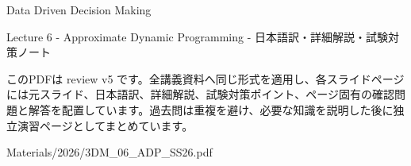 \documentclass[a4paper,landscape,9pt]{article}
\begin{document}
\begin{titlepage}
\centering
\vspace*{2cm}
{\Huge Data Driven Decision Making\par}
\vspace{0.5cm}
{\Large Lecture 6 - Approximate Dynamic Programming - 日本語訳・詳細解説・試験対策ノート\par}
\vspace{1cm}
\begin{minipage}{0.82\textwidth}
このPDFは review v5 です。全講義資料へ同じ形式を適用し、各スライドページには元スライド、日本語訳、詳細解説、試験対策ポイント、ページ固有の確認問題と解答を配置しています。過去問は重複を避け、必要な知識を説明した後に独立演習ページとしてまとめています。
\end{minipage}
\vfill
{\large Materials/2026/3DM\_06\_ADP\_SS26.pdf}
\end{titlepage}
\tableofcontents
\clearpage

\end{document}
